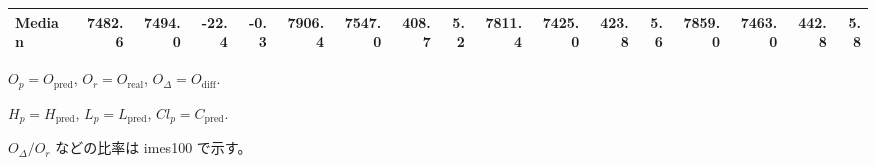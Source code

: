 \begin{threeparttable}
{\begin{tabular}{lrrrrrrrrrrrrrrrr}
 Median & 7482.6 & 7494.0 &      -22.4 &           -0.3 &  7906.4 & 7547.0 &      408.7 &            5.2 & 7811.4 & 7425.0 &      423.8 &            5.6 & 7859.0 & 7463.0 &       442.8 &              5.8 \\
\bottomrule
\end{tabular}
}
\begin{tablenotes}\footnotesize
\item $O_p=O_{\text{pred}}$, $O_r=O_{\text{real}}$, $O_\Delta=O_{\text{diff}}$.
\item $H_p=H_{\text{pred}}$, $L_p=L_{\text{pred}}$, $Cl_p=C_{\text{pred}}$.
\item $O_\Delta/O_r$ などの比率は 	imes100 で示す。
\end{tablenotes}
\end{threeparttable}
\endgroup
